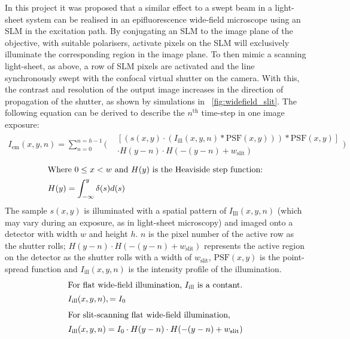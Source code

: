 In this project it was proposed that a similar effect to a swept beam in a \gls{light-sheet} system can be realised in an epifluorescence \gls{wide-field} microscope using an \gls{SLM} in the excitation path.
By conjugating an \gls{SLM} to the image plane of the objective, with suitable polarisers, activate pixels on the \gls{SLM} will exclusively illuminate the corresponding region in the image plane.
To then mimic a scanning \gls{light-sheet}, as above, a row of \gls{SLM} pixels are activated and the line synchronously swept with the confocal virtual shutter on the camera.
With this, the contrast and resolution of the output image increases in the direction of propagation of the shutter, as shown by simulations in \figurename~\ref{fig:widefield_slit}.
The following equation can be derived to describe the \(n^\text{th}\) time-step in one image exposure:
\begin{align}
    I_{\text{em}}(x,y,n) = \sum_{n=0}^{n=h-1}
    \Biggl(\begin{split}
                &\left[ (s(x,y) \cdot (I_{\text{ill}}(x,y,n) * \text{PSF}(x,y))) * \text{PSF}(x,y) \right] \\ &\cdot  H(y-n) \cdot H(-(y-n)+w_{\text{slit}})
    \end{split}\Biggr)
\end{align}
\begin{align}
    \intertext{Where \(0\leq x < w \) and \(H(y)\) is the Heaviside step function:}
     H(y) = \int_{-\infty}^y \delta(s) d(s)
\end{align}
The sample \(s(x,y)\) is illuminated with a spatial pattern of \(I_{\text{Ill}}(x,y,n)\) (which may vary during an exposure, as in \gls{light-sheet} microscopy) and imaged onto a detector with width \(w\) and height \(h\).
\(n\) is the pixel number of the active row as the shutter rolls; \(H(y-n) \cdot H(-(y-n)+w_{\text{slit}})\) represents the active region on the detector as the shutter rolls with a width of \(w_{\text{slit}}\), \(\text{PSF}(x,y)\) is the point-spread function and \(I_{\text{ill}}(x,y,n)\) is the intensity profile of the illumination.
\begin{align}
    \intertext{For flat wide-field illumination, \(I_{\text{ill}}\) is a contant.}
    I_{\text{ill}}(x,y,n),  = {I_0}
\end{align}
\begin{align}
    \intertext{For slit-scanning flat wide-field illumination,}
    I_{\text{ill}}(x,y,n) = {I_0} \cdot  H(y-n) \cdot H(-(y-n)+w_{\text{slit}})
\end{align}
